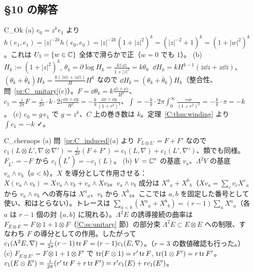 \subsection*{§10 の解答}
\begin{soll}{C_Ok}
(a) $e_0=z^ke_1$ より $h(e_1,e_1)=|z|^{-2k}h(e_0,e_0)=|z|^{-2k}(1+|z|^2)^k=(|z|^{-2}+1)^k=(1+|w|^2)^k$。これは $U_1=\{w\in\mathbb C\}$ 全体で滑らかで正（$w=0$ でも $1$）。
(b) $H_k:=(1+|z|^2)^k$, $\theta_k=\partial\log H_k=\frac{k\bar z\,\dd z}{1+|z|^2}=k\theta$。$\dd H_k=kH^{k-1}(\bar z\dd z+z\dd\bar z)$、$(\theta_k+\bar\theta_k)H_k=\frac{k(\bar z\dd z+z\dd\bar z)}{H}H^k$ なので $\dd H_k=(\theta_k+\bar\theta_k)H_k$（整合性、問~\ref{pr:C_unitary}(c)）。$F=\dd\theta_k=k\frac{\dd\bar z\wedge\dd z}{H^2}$、$c_1=\frac i{2\pi}F=\frac i{2\pi}\cdot k\cdot2i\frac{\dd x\wedge\dd y}{H^2}=-\frac k\pi\frac{\dd x\wedge\dd y}{(1+r^2)^2}$、$\int=-\frac k\pi\cdot2\pi\int_0^\infty\frac{r\dd r}{(1+r^2)^2}=-\frac k\pi\cdot\pi=-k$。
(c) $e_0=g\,e_1$ で $g=z^k$、$C$ 上の巻き数は $k$。定理~\ref{C:thm:winding} より $\int c_1=-k$ ✓。
\end{soll}

\begin{soll}{C_chernops}
(a) 問~\ref{pr:C_induced}(a) より $F_{L\otimes L'}=F+F'$ なので $c_1(L\otimes L',\nabla\otimes\nabla')=\frac i{2\pi}(F+F')=c_1(L,\nabla)+c_1(L',\nabla')$、類でも同様。$F_{L^*}=-F$ から $c_1(L^*)=-c_1(L)$。
(b) $V=\mathbb C^r$ の基底 $v_a$、$\Lambda^2V$ の基底 $v_a\wedge v_b$（$a<b$）。$X$ を導分として作用させる：$X(v_a\wedge v_b)=Xv_a\wedge v_b+v_a\wedge Xv_b$。$v_a\wedge v_b$ 成分は $X^a{}_a+X^b{}_b$（$Xv_a=\sum_cv_cX^c{}_a$ から $v_a\wedge v_b$ への寄与は $X^a{}_a$、$v_b$ から $X^b{}_b$。ここでは $a,b$ を固定した番号として使い、和はとらない）。トレースは $\sum_{a<b}(X^a{}_a+X^b{}_b)=(r-1)\sum_aX^a{}_a$（各 $a$ は $r-1$ 個の対 $\{a,b\}$ に現れる）。$\Lambda^2E$ の誘導接続の曲率は $F_{E\otimes E}=F\otimes1+1\otimes F$（\ref{C:ss:unitary} 節）の部分束 $\Lambda^2E\subset E\otimes E$ への制限、すなわち $F$ の導分としての作用。したがって $c_1(\Lambda^2E,\nabla)=\frac i{2\pi}(r-1)\operatorname{tr} F=(r-1)c_1(E,\nabla)$。（$r=3$ の数値確認も行った。）
(c) $F_{E\otimes E'}=F\otimes1+1\otimes F'$ で $\operatorname{tr}(F\otimes1)=r'\operatorname{tr} F$, $\operatorname{tr}(1\otimes F')=r\operatorname{tr} F'$。$c_1(E\otimes E')=\frac i{2\pi}(r'\operatorname{tr} F+r\operatorname{tr} F')=r'c_1(E)+rc_1(E')$。
\end{soll}


